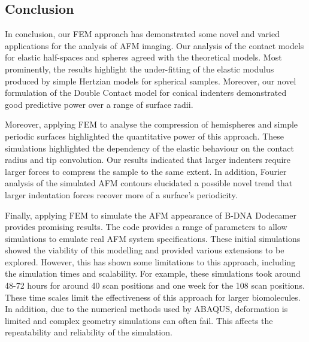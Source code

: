 \subsection{Conclusion}

In conclusion, our FEM approach has demonstrated some novel and varied applications for the analysis of AFM imaging. Our analysis of the contact models for elastic half-spaces and spheres agreed with the theoretical models. Most prominently, the results highlight the under-fitting of the elastic modulus produced by simple Hertzian models for spherical samples. Moreover, our novel formulation of the Double Contact model for conical indenters demonstrated good predictive power over a range of surface radii.  

 Moreover, applying FEM to analyse the compression of hemispheres and simple periodic surfaces highlighted the quantitative power of this approach. These simulations highlighted the dependency of the elastic behaviour on the contact radius and tip convolution. Our results indicated that larger indenters require larger forces to compress the sample to the same extent. In addition, Fourier analysis of the simulated AFM contours elucidated a possible novel trend that larger indentation forces recover more of a surface's periodicity. 

Finally, applying FEM to simulate the AFM appearance of B-DNA Dodecamer provides promising results. The code provides a range of parameters to allow simulations to emulate real AFM system specifications. These initial simulations showed the viability of this modelling and provided various extensions to be explored. However, this has shown some limitations to this approach, including the simulation times and scalability. For example, these simulations took around 48-72 hours for around 40 scan positions and one week for the 108 scan positions. These time scales limit the effectiveness of this approach for larger biomolecules. In addition, due to the numerical methods used by ABAQUS, deformation is limited and complex geometry simulations can often fail. This affects the repeatability and reliability of the simulation. 

